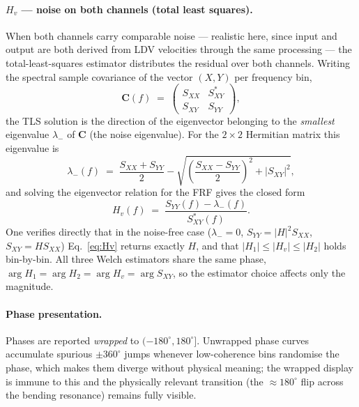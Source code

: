 \paragraph{$H_v$ — noise on both channels (total least squares).}
When both channels carry comparable noise — realistic here, since input and
output are both derived from LDV velocities through the same processing —
the total-least-squares estimator distributes the residual over both
channels. Writing the spectral sample covariance of the vector $(X, Y)$ per
frequency bin,
\begin{equation}
  \mathbf{C}(f) \;=\;
  \begin{pmatrix} S_{XX} & S_{XY}^* \\ S_{XY} & S_{YY} \end{pmatrix},
\end{equation}
the TLS solution is the direction of the eigenvector belonging to the
\emph{smallest} eigenvalue $\lambda_-$ of $\mathbf{C}$ (the noise
eigenvalue). For the $2\times 2$ Hermitian matrix this eigenvalue is
\begin{equation}
  \lambda_-(f) \;=\; \frac{S_{XX}+S_{YY}}{2}
    - \sqrt{\left(\frac{S_{XX}-S_{YY}}{2}\right)^{\!2} + |S_{XY}|^2},
\end{equation}
and solving the eigenvector relation for the FRF gives the closed form
\begin{equation}
  H_v(f) \;=\; \frac{S_{YY}(f) - \lambda_-(f)}{S_{XY}^*(f)} .
  \label{eq:Hv}
\end{equation}
One verifies directly that in the noise-free case ($\lambda_- = 0$,
$S_{YY} = |H|^2 S_{XX}$, $S_{XY} = H S_{XX}$) Eq.~\eqref{eq:Hv} returns
exactly $H$, and that $|H_1| \le |H_v| \le |H_2|$ holds bin-by-bin. All
three Welch estimators share the same phase,
$\arg H_1 = \arg H_2 = \arg H_v = \arg S_{XY}$, so the estimator choice
affects only the magnitude.

\paragraph{Phase presentation.}
Phases are reported \emph{wrapped} to $(-180^\circ, 180^\circ]$. Unwrapped
phase curves accumulate spurious $\pm 360^\circ$ jumps whenever
low-coherence bins randomise the phase, which makes them diverge without
physical meaning; the wrapped display is immune to this and the physically
relevant transition (the $\approx 180^\circ$ flip across the bending
resonance) remains fully visible.

